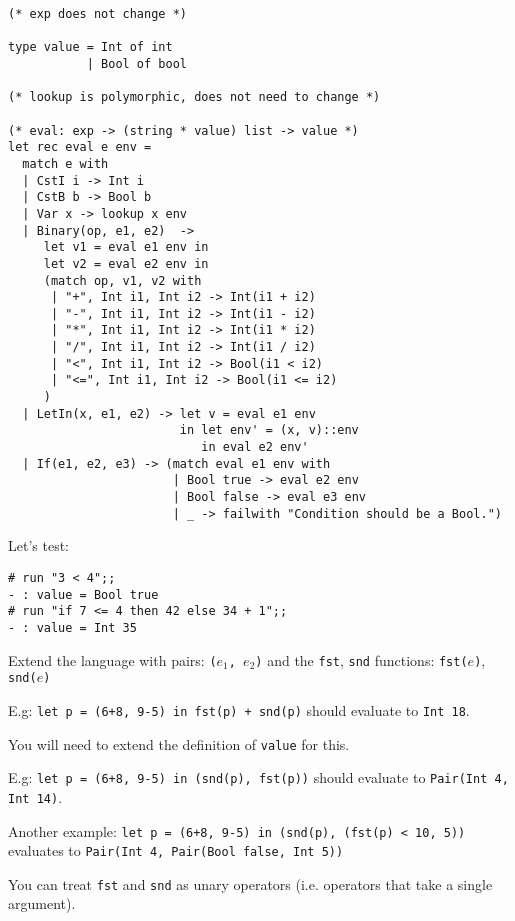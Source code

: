 \documentclass[addpoints]{exam}
\begin{document}
\begin{questions}
  \begin{solution}
    \begin{verbatim}
(* exp does not change *)

type value = Int of int
           | Bool of bool

(* lookup is polymorphic, does not need to change *)

(* eval: exp -> (string * value) list -> value *)
let rec eval e env =
  match e with
  | CstI i -> Int i
  | CstB b -> Bool b
  | Var x -> lookup x env
  | Binary(op, e1, e2)  ->
     let v1 = eval e1 env in
     let v2 = eval e2 env in
     (match op, v1, v2 with
      | "+", Int i1, Int i2 -> Int(i1 + i2)
      | "-", Int i1, Int i2 -> Int(i1 - i2)
      | "*", Int i1, Int i2 -> Int(i1 * i2)
      | "/", Int i1, Int i2 -> Int(i1 / i2)
      | "<", Int i1, Int i2 -> Bool(i1 < i2)
      | "<=", Int i1, Int i2 -> Bool(i1 <= i2)
     )
  | LetIn(x, e1, e2) -> let v = eval e1 env
                        in let env' = (x, v)::env
                           in eval e2 env'
  | If(e1, e2, e3) -> (match eval e1 env with
                       | Bool true -> eval e2 env
                       | Bool false -> eval e3 env
                       | _ -> failwith "Condition should be a Bool.")
    \end{verbatim}


    Let's test:
    \begin{verbatim}
# run "3 < 4";;
- : value = Bool true
# run "if 7 <= 4 then 42 else 34 + 1";;
- : value = Int 35
    \end{verbatim}
  \end{solution}
  

  \question
  Extend the language with pairs: \texttt{($e_1$, $e_2$)}
  and the \texttt{fst}, \texttt{snd}
  functions: \texttt{fst($e$)}, \texttt{snd($e$)} 

  E.g: \texttt{let p = (6+8, 9-5) in fst(p) + snd(p)}
  should evaluate to \texttt{Int 18}.

  You will need to extend the definition of \texttt{value} for this.

  E.g: \texttt{let p = (6+8, 9-5) in (snd(p), fst(p))}
  should evaluate to \texttt{Pair(Int 4, Int 14)}.

  Another example:
  \texttt{let p = (6+8, 9-5) in (snd(p), (fst(p) < 10, 5))}
  evaluates to \texttt{Pair(Int 4, Pair(Bool false, Int 5))}

  You can treat \texttt{fst} and \texttt{snd} as unary operators
  (i.e. operators that take a single argument).
  

\end{questions}
\end{document}
